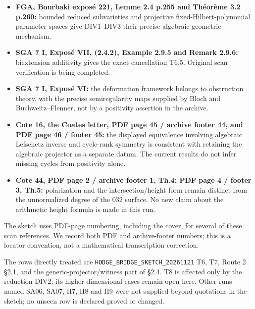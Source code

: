 \documentclass[11pt,a4paper]{article}
\providecommand{\tightlist}{\setlength{\itemsep}{0pt}\setlength{\parskip}{0pt}}
\theoremstyle{definition}
\begin{document}
\begin{itemize}
\tightlist
\item
  \textbf{FGA, Bourbaki exposé 221, Lemme 2.4 p.255 and Théorème 3.2
  p.260:} bounded reduced subvarieties and projective
  fixed-Hilbert-polynomial parameter spaces give DIV1--DIV3 their
  precise algebraic-geometric mechanism.
\item
  \textbf{SGA 7 I, Exposé VII, (2.4.2), Example 2.9.5 and Remark 2.9.6:}
  biextension additivity gives the exact cancellation T6.5. Original
  scan verification is being completed.
\item
  \textbf{SGA 7 I, Exposé VI:} the deformation framework belongs to
  obstruction theory, with the precise semiregularity maps supplied by
  Bloch and Buchweitz--Flenner, not by a positivity assertion in the
  archive.
\item
  \textbf{Cote 16, the Coates letter, PDF page 45 / archive footer 44,
  and PDF page 46 / footer 45:} the displayed equivalence involving
  algebraic Lefschetz inverse and cycle-rank symmetry is consistent with
  retaining the algebraic projector as a separate datum. The current
  results do not infer missing cycles from positivity alone.
\item
  \textbf{Cote 44, PDF page 2 / archive footer 1, Th.4; PDF page 4 /
  footer 3, Th.5:} polarization and the intersection/height form remain
  distinct from the unnormalized degree of the 032 surface. No new claim
  about the arithmetic height formula is made in this run.
\end{itemize}

The sketch uses PDF-page numbering, including the cover, for several of
these scan references. We record both PDF and archive-footer numbers;
this is a locator convention, not a mathematical transcription
correction.

The rows directly treated are \texttt{HODGE\_BRIDGE\_SKETCH\_20261121}
T6, T7, Route 2 §2.1, and the generic-projector/witness part of §2.4. T8
is affected only by the reduction DIV2; its higher-dimensional cases
remain open here. Other runs named SA06, SA07, H7, H8 and H9 were not
supplied beyond quotations in the sketch; no unseen row is declared
proved or changed.
\end{document}
